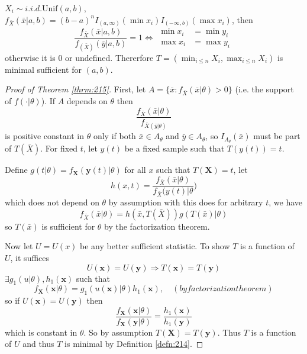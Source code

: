 \documentclass[english, 11pt]{article}
\begin{document}
\begin{exmp}
$X_i\sim i.i.d. \text{Unif}(a, b)$, $f_{\bar{X}}(\bar{x}|a,b)=(b-a)^nI_{(a, \infty)}(\min x_i)I_{(-\infty, b)}(\max x_i)$, then
$$
\frac{f_{\bar{X}}(\bar{x}|a, b)}{f_{(\bar{X})}(\bar{y}|a, b)}=1\Leftrightarrow \begin{aligned}\min x_i&=\min y_i\\
\max x_i&=\max y_i\end{aligned}
$$
otherwise it is 0 or undefined. Thererfore $T=(\min_{i\leqslant n}X_i, \max_{i\leqslant n}X_i)$ is minimal sufficient for $(a,b)$.
\end{exmp}

\begin{proof}[Proof of Theorem \ref{thrm:215}]
First, let $A=\{\bar{x}:f_{\bar{X}}(\bar{x}|\theta)>0\}$ (i.e. the support of $f(\cdot|\theta)$). If $A$ depends on $\theta$ then
$$
\frac{f_{\bar{X}}(\bar{x}|\theta)}{f_{\bar{X}(\bar{y}|\theta)}}
$$
is positive constant in $\theta$ only if both $\bar{x}\in A_{\theta}$ and $\bar{y}\in A_{\theta}$, so $I_{A_{\theta}}(\bar{x})$ must be part of $T(\bar{X})$. For fixed $t$, let $y(t)$ be a fixed sample such that $T(y(t))=t$.

Define $g(t|\theta)=f_{\bm{X}}(\bm{y}(t)|\theta)$ for all $x$ such that $T(\bm{X})=t$, let 
$$
h(x, t)=\frac{f_{\bar{X}}(\bar{x}|\theta)}{f_{\bar{X}}(y(t)|\theta})
$$
which does not depend on $\theta$ by assumption with this does for arbitrary $t$, we have
$$
f_{\bar{X}}(\bar{x}|\theta)=h(\bar{x}, T(\bar{X}))g(T(\bar{x})|\theta)
$$
so $T(\bar{x})$ is sufficient for $\theta$ by the factorization theorem.

Now let $U=U(x)$ be any better sufficient statistic. To show $T$ is a function of $U$, it suffices
$$
U(\bm{x})=U(\bm{y})\Rightarrow T(\bm{x})=T(\bm{y})
$$
$\exists g_1(u|\theta), h_1(\bm{x})$ such that
$$
f_{\bm{X}}(\bm{x}|\theta)=g_1(u(\bm{x})|\theta)h_1(\bm{x}),\quad (by factorization theorem)
$$
so if $U(\bm{x})=U(\bm{y})$ then
$$
\frac{f_{\bm{X}}(\bm{x}|\theta)}{f_{\bm{X}}(\bm{y}|\theta)}=\frac{h_1(\bm{x})}{h_1(\bm{y})}
$$
which is constant in $\theta$. So by assumption $T(\bm{X})=T(\bm{y})$. Thus $T$ is a function of $U$ and thus $T$ is minimal by Definition \ref{defn:214}.
\end{proof}
\end{document}
